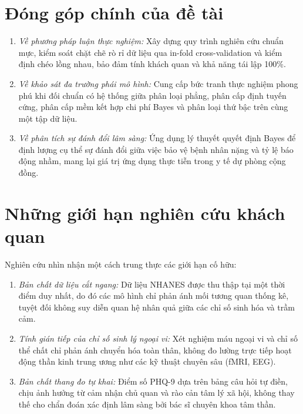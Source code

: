 \section{Đóng góp chính của đề tài}
\label{sec:dong-gop-de-tai}

\begin{enumerate}
    \item \textit{Về phương pháp luận thực nghiệm:} Xây dựng quy trình nghiên cứu chuẩn mực, kiểm soát chặt chẽ rò rỉ dữ liệu qua in-fold cross-validation và kiểm định chéo lồng nhau, bảo đảm tính khách quan và khả năng tái lập 100\%.
    \item \textit{Về khảo sát đa trường phái mô hình:} Cung cấp bức tranh thực nghiệm phong phú khi đối chuẩn có hệ thống giữa phân loại phẳng, phân cấp định tuyến cứng, phân cấp mềm kết hợp chi phí Bayes và phân loại thứ bậc trên cùng một tập dữ liệu.
    \item \textit{Về phân tích sự đánh đổi lâm sàng:} Ứng dụng lý thuyết quyết định Bayes để định lượng cụ thể sự đánh đổi giữa việc bảo vệ bệnh nhân nặng và tỷ lệ báo động nhầm, mang lại giá trị ứng dụng thực tiễn trong y tế dự phòng cộng đồng.
\end{enumerate}

\section{Những giới hạn nghiên cứu khách quan}
\label{sec:han-che-nghien-cuu}

Nghiên cứu nhìn nhận một cách trung thực các giới hạn cố hữu:
\begin{enumerate}
    \item \textit{Bản chất dữ liệu cắt ngang:} Dữ liệu NHANES được thu thập tại một thời điểm duy nhất, do đó các mô hình chỉ phản ánh mối tương quan thống kê, tuyệt đối không suy diễn quan hệ nhân quả giữa các chỉ số sinh hóa và trầm cảm.
    \item \textit{Tính gián tiếp của chỉ số sinh lý ngoại vi:} Xét nghiệm máu ngoại vi và chỉ số thể chất chỉ phản ánh chuyển hóa toàn thân, không đo lường trực tiếp hoạt động thần kinh trung ương như các kỹ thuật chuyên sâu (fMRI, EEG).
    \item \textit{Bản chất thang đo tự khai:} Điểm số PHQ-9 dựa trên bảng câu hỏi tự điền, chịu ảnh hưởng từ cảm nhận chủ quan và rào cản tâm lý xã hội, không thay thế cho chẩn đoán xác định lâm sàng bởi bác sĩ chuyên khoa tâm thần.
\end{enumerate}

